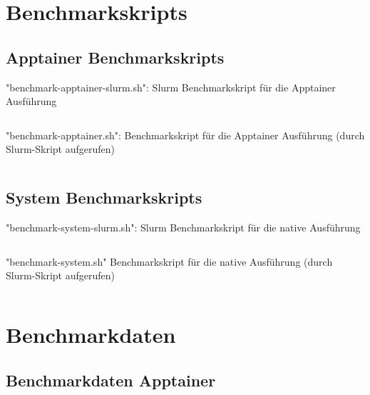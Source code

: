 \chapter{Benchmarkskripts} \label{cha:appendix-benchmarkskripts}

\section{Apptainer Benchmarkskripts}

\begin{listing}[H]
    \caption{"benchmark-apptainer-slurm.sh": Slurm Benchmarkskript für die Apptainer Ausführung}
    \label{lst:appdx-slurm-benchmark-apptainer}
    \inputminted{bash}{./code-examples/benchmark-apptainer-slurm.sh}
\end{listing}

\begin{listing}[H]
    \caption{"benchmark-apptainer.sh": Benchmarkskript für die Apptainer Ausführung (durch Slurm-Skript aufgerufen)}
    \label{lst:appdx-benchmark-apptainer}
    \inputminted{bash}{./code-examples/benchmark-apptainer.sh}
\end{listing}

\section{System Benchmarkskripts}

\begin{listing}[H]
    \caption{"benchmark-system-slurm.sh": Slurm Benchmarkskript für die native Ausführung}
    \label{lst:appdx-slurm-benchmark-system}
    \inputminted{bash}{./code-examples/benchmark-system-slurm.sh}
\end{listing}
\pagebreak

\begin{listing}[H]
    \caption{"benchmark-system.sh" Benchmarkskript für die native Ausführung (durch Slurm-Skript aufgerufen)}
    \label{lst:appdx-benchmark-system}
    \inputminted{bash}{./code-examples/benchmark-system.sh}
\end{listing}


\chapter{Benchmarkdaten} \label{cha:appendix-benchmarkdaten}

\section{Benchmarkdaten Apptainer}

